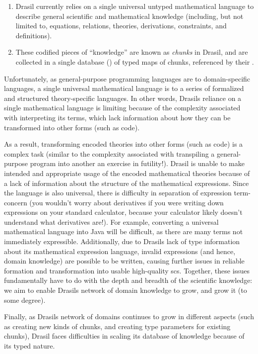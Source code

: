 \begin{enumerate}

      \item Drasil currently relies on a single universal untyped mathematical
            language to describe general scientific and mathematical knowledge
            (including, but not limited to, equations, relations, theories,
            derivations, constraints, and definitions).

      \item These codified pieces of ``knowledge'' are known as \textit{chunks}
            in Drasil, and are collected in a single database
            () of typed maps of chunks, referenced by
            their .

\end{enumerate}




Unfortunately, as general-purpose programming languages are to domain-specific
languages, a single universal mathematical language is to a series of formalized
and structured theory-specific languages. In other words, Drasils reliance on a
single mathematical language is limiting because of the complexity associated
with interpreting its terms, which lack information about how they can be
transformed into other forms (such as code).

As a result, transforming encoded theories into other forms (such as code) is a
complex task (similar to the complexity associated with transpiling a
general-purpose program into another \textemdash{} an exercise in futility!).
Drasil is unable to make intended and appropriate usage of the encoded
mathematical theories because of a lack of information about the structure of
the mathematical expressions. Since the language is also universal, there is
difficulty in separation of expression term-concern (you wouldn't worry about
derivatives if you were writing down expressions on your standard calculator,
because your calculator likely doesn't understand what derivatives are!). For
example, converting a universal mathematical language into Java will be
difficult, as there are many terms not immediately expressible. Additionally,
due to Drasils lack of type information about its mathematical expression
language, invalid expressions (and hence, domain knowledge) are possible to be
written, causing further issues in reliable formation and transformation into
usable high-quality \acs{scs}. Together, these issues fundamentally have to do
with the depth and breadth of the scientific knowledge: we aim to enable Drasils
network of domain knowledge to grow, and grow it (to some degree).

Finally, as Drasils network of domains continues to grow in different aspects
(such as creating new kinds of chunks, and creating type parameters for existing
chunks), Drasil faces difficulties in scaling its database of knowledge because
of its typed nature.


